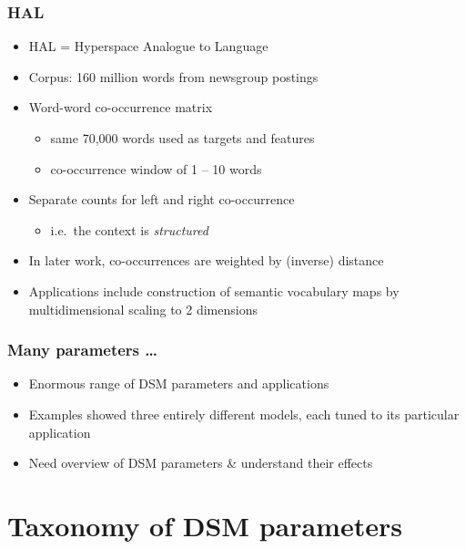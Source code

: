 \documentclass[t]{beamer} %
\begin{document}
\begin{frame}
  \frametitle{HAL \citep{Lund:Burgess:96}}

  \begin{itemize}
  \item HAL = Hyperspace Analogue to Language
  \item Corpus: 160 million words from newsgroup postings
  \item Word-word co-occurrence matrix
    \begin{itemize}
    \item same 70,000 words used as targets and features
    \item co-occurrence window of 1 -- 10 words
    \end{itemize}
  \item Separate counts for left and right co-occurrence
    \begin{itemize}
    \item i.e.\ the context is \emph{structured}
    \end{itemize}
  \item In later work, co-occurrences are weighted by (inverse) distance \citep{Li:Burgess:Lund:00}
  \item Applications include construction of semantic vocabulary maps
    by multidimensional scaling to 2 dimensions
  \end{itemize}
\end{frame}

\begin{frame}
  \frametitle{Many parameters \ldots}

  \begin{itemize}
  \item Enormous range of DSM parameters and applications
  \item Examples showed three entirely different models, each tuned to
    its particular application
  \item[\So] Need overview of DSM parameters \& understand their effects
  \end{itemize}
\end{frame}

\section{Taxonomy of DSM parameters}

\end{document}
